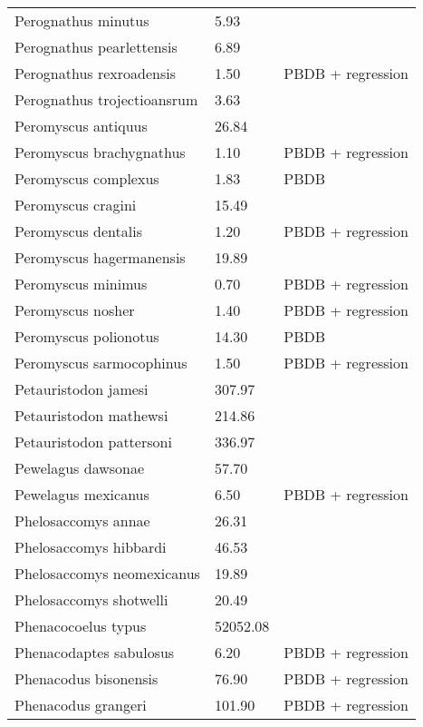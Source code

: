 \documentclass{article}
\begin{document}
\begin{center}
\begin{longtable}{p{} p{} p{}}
    Perognathus minutus & 5.93 & \cite{Tomiya2013} \\ 
    Perognathus pearlettensis & 6.89 & \cite{Tomiya2013} \\ 
    Perognathus rexroadensis & 1.50 & PBDB + regression \\ 
    Perognathus trojectioansrum & 3.63 & \cite{Tomiya2013} \\ 
    Peromyscus antiquus & 26.84 & \cite{Tomiya2013} \\ 
    Peromyscus brachygnathus & 1.10 & PBDB + regression \\ 
    Peromyscus complexus & 1.83 & PBDB \\ 
    Peromyscus cragini & 15.49 & \cite{Tomiya2013} \\ 
    Peromyscus dentalis & 1.20 & PBDB + regression \\ 
    Peromyscus hagermanensis & 19.89 & \cite{Tomiya2013} \\ 
    Peromyscus minimus & 0.70 & PBDB + regression \\ 
    Peromyscus nosher & 1.40 & PBDB + regression \\ 
    Peromyscus polionotus & 14.30 & PBDB \\ 
    Peromyscus sarmocophinus & 1.50 & PBDB + regression \\ 
    Petauristodon jamesi & 307.97 & \cite{Tomiya2013} \\ 
    Petauristodon mathewsi & 214.86 & \cite{Tomiya2013} \\ 
    Petauristodon pattersoni & 336.97 & \cite{Tomiya2013} \\ 
    Pewelagus dawsonae & 57.70 & \cite{Jepsen1932} \\ 
    Pewelagus mexicanus & 6.50 & PBDB + regression \\ 
    Phelosaccomys annae & 26.31 & \cite{Tomiya2013} \\ 
    Phelosaccomys hibbardi & 46.53 & \cite{Tomiya2013} \\ 
    Phelosaccomys neomexicanus & 19.89 & \cite{Tomiya2013} \\ 
    Phelosaccomys shotwelli & 20.49 & \cite{Tomiya2013} \\ 
    Phenacocoelus typus & 52052.08 & \cite{Tomiya2013} \\ 
    Phenacodaptes sabulosus & 6.20 & PBDB + regression \\ 
    Phenacodus bisonensis & 76.90 & PBDB + regression \\ 
    Phenacodus grangeri & 101.90 & PBDB + regression \\ 

\end{longtable}
\end{center}
\end{document}
